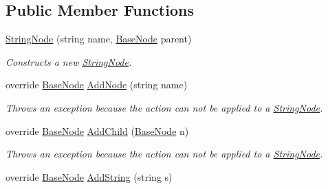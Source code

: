 \subsection*{Public Member Functions}
\begin{DoxyCompactItemize}
\item 
\hyperlink{class_x_m_leru_handleru_1_1_string_node_a4c1eafc0ac995e89ef5a4af85c0f9c19}{String\+Node} (string name, \hyperlink{class_x_m_leru_handleru_1_1_base_node}{Base\+Node} parent)
\begin{DoxyCompactList}\small\item\em Constructs a new \hyperlink{class_x_m_leru_handleru_1_1_string_node}{String\+Node}. \end{DoxyCompactList}\item 
\hypertarget{class_x_m_leru_handleru_1_1_string_node_a577acb87d6791fc9aeacaf9e8e6effcb}{}override \hyperlink{class_x_m_leru_handleru_1_1_base_node}{Base\+Node} \hyperlink{class_x_m_leru_handleru_1_1_string_node_a577acb87d6791fc9aeacaf9e8e6effcb}{Add\+Node} (string name)\label{class_x_m_leru_handleru_1_1_string_node_a577acb87d6791fc9aeacaf9e8e6effcb}

\begin{DoxyCompactList}\small\item\em Throws an exception because the action can not be applied to a \hyperlink{class_x_m_leru_handleru_1_1_string_node}{String\+Node}. \end{DoxyCompactList}\item 
\hypertarget{class_x_m_leru_handleru_1_1_string_node_a4e5019cd4fa98a233d1d1d580a861dc4}{}override \hyperlink{class_x_m_leru_handleru_1_1_base_node}{Base\+Node} \hyperlink{class_x_m_leru_handleru_1_1_string_node_a4e5019cd4fa98a233d1d1d580a861dc4}{Add\+Child} (\hyperlink{class_x_m_leru_handleru_1_1_base_node}{Base\+Node} n)\label{class_x_m_leru_handleru_1_1_string_node_a4e5019cd4fa98a233d1d1d580a861dc4}

\begin{DoxyCompactList}\small\item\em Throws an exception because the action can not be applied to a \hyperlink{class_x_m_leru_handleru_1_1_string_node}{String\+Node}. \end{DoxyCompactList}\item 
\hypertarget{class_x_m_leru_handleru_1_1_string_node_a5eb5f6d350d6fe0561e9bee5370f9038}{}override \hyperlink{class_x_m_leru_handleru_1_1_base_node}{Base\+Node} \hyperlink{class_x_m_leru_handleru_1_1_string_node_a5eb5f6d350d6fe0561e9bee5370f9038}{Add\+String} (string s)\label{class_x_m_leru_handleru_1_1_string_node_a5eb5f6d350d6fe0561e9bee5370f9038}


\end{DoxyCompactItemize}
